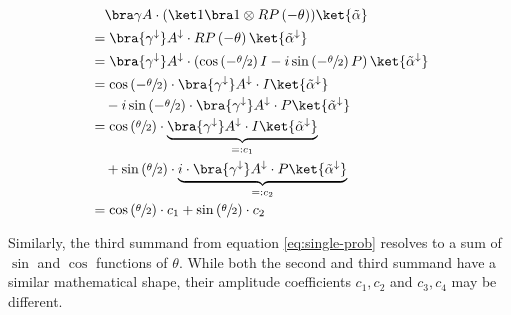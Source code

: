 \begin{equation}
    \label{eq:single-prob-simplification1}
    \begin{split}
            &\quad \bra\gamma A \cdot (\ket 1 \bra 1 \otimes RP\left(-\theta\right)) \ket{\tilde\alpha} \\
            &= \bra{\gamma^\downarrow} A^\downarrow \cdot RP\left(-\theta\right) \ket{\tilde\alpha^\downarrow} \\
            &= \bra{\gamma^\downarrow} A^\downarrow \cdot \left(\cos\left(-\sfrac\theta2\right) I - i \sin\left(-\sfrac\theta2\right) P\right) \ket{\tilde\alpha^\downarrow} \\
            &= \cos\left(-\sfrac\theta2\right) \cdot \bra{\gamma^\downarrow} A^\downarrow \cdot I \ket{\tilde\alpha^\downarrow} \\
                &\quad - i \sin\left(-\sfrac\theta2\right) \cdot \bra{\gamma^\downarrow} A^\downarrow \cdot P \ket{\tilde\alpha^\downarrow} \\
            &= \cos\left(\sfrac\theta2\right) \cdot \underbrace{\bra{\gamma^\downarrow} A^\downarrow \cdot I \ket{\tilde\alpha^\downarrow}}_{=: c_1} \\
                &\quad + \sin\left(\sfrac\theta2\right) \cdot \underbrace{i \cdot \bra{\gamma^\downarrow} A^\downarrow \cdot P \ket{\tilde\alpha^\downarrow}}_{=: c_2} \\
            &= \cos\left(\sfrac\theta2\right) \cdot c_1 + \sin\left(\sfrac\theta2\right) \cdot c_2
    \end{split}
\end{equation}

Similarly, the third summand from equation \ref{eq:single-prob} resolves to a
sum of $\sin$ and $\cos$ functions of $\theta$.
While both the second and third summand have a similar mathematical shape, their
amplitude coefficients $c_1, c_2$ and $c_3, c_4$ may be different.

